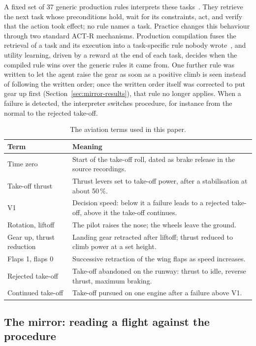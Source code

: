 \documentclass{llncs}
\begin{document}
A fixed set of 37 generic production rules interprets these tasks~\cite{kengne_cpilot_2026}. They retrieve the next task whose
preconditions hold, wait for its constraints, act, and verify that the action took effect; no rule names a task. Practice changes this
behaviour through two standard ACT-R mechanisms. Production compilation fuses the retrieval of a task and its execution into a
task-specific rule nobody wrote~\cite{taatgen_lee_2003}, and utility learning, driven by a reward at the end of each task, decides when
the compiled rule wins over the generic rules it came from. One further rule was written to let the agent raise the gear as soon as a
positive climb is seen instead of following the written order; once the written order itself was corrected to put gear up first
(Section~\ref{sec:mirror-results}), that rule no longer applies. When a failure is detected, the interpreter switches procedure, for
instance from the normal to the rejected take-off.

\begin{table}[t]
\caption{The aviation terms used in this paper.}
\label{tab:glossary}
\centering\small
\begin{tabular}{@{}p{3.7cm}p{8.1cm}@{}}
\toprule
Term & Meaning \\
\midrule
Time zero & Start of the take-off roll, dated as brake release in the source recordings. \\
Take-off thrust & Thrust levers set to take-off power, after a stabilisation at about 50\,\%. \\
V1 & Decision speed: below it a failure leads to a rejected take-off, above it the take-off continues. \\
Rotation, liftoff & The pilot raises the nose; the wheels leave the ground. \\
Gear up, thrust reduction & Landing gear retracted after liftoff; thrust reduced to climb power at a set height. \\
Flaps 1, flaps 0 & Successive retraction of the wing flaps as speed increases. \\
Rejected take-off & Take-off abandoned on the runway: thrust to idle, reverse thrust, maximum braking. \\
Continued take-off & Take-off pursued on one engine after a failure above V1. \\
\bottomrule
\end{tabular}
\end{table}

\subsection{The mirror: reading a flight against the procedure}
\end{document}
